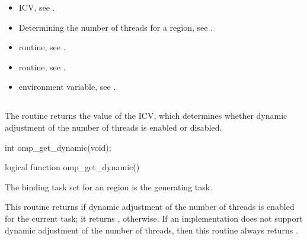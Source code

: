 \crossreferences
\begin{itemize}
\item {} ICV, see 
.

\item Determining the number of threads for a  region, see
. 

\item {} routine, see 
.

\item {} routine, see 
.

\item {} environment variable, see 
.
\end{itemize}








\subsection{}
\label{subsec:omp_get_dynamic}
\summary
The  routine returns the value of the  ICV, which 
determines whether dynamic adjustment of the number of threads is enabled or disabled.

\format
\ccppspecificstart
\begin{boxedcode}
int omp\_get\_dynamic(void);
\end{boxedcode}
\ccppspecificend

\fortranspecificstart
\begin{boxedcode}
logical function omp\_get\_dynamic()
\end{boxedcode}
\fortranspecificend

\binding
The binding task set for an  region is the generating task. 

\effect
This routine returns  if dynamic adjustment of the number of threads is enabled for 
the current task; it returns , otherwise. If an implementation does not support 
dynamic adjustment of the number of threads, then this routine always returns .

